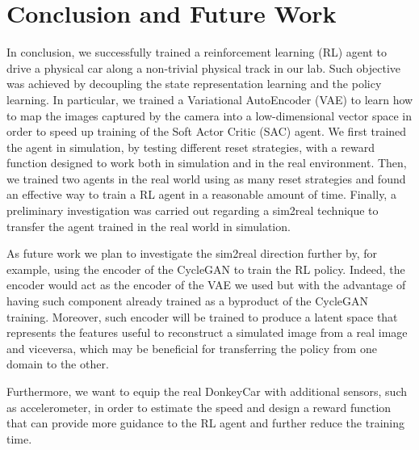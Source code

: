 \chapter{Conclusion and Future Work}

In conclusion, we successfully trained a reinforcement learning (RL) agent to drive a physical car along a non-trivial physical track in our lab. Such objective was achieved by decoupling the state representation learning and the policy learning. In particular, we trained a Variational AutoEncoder (VAE) to learn how to map the images captured by the camera into a low-dimensional vector space in order to speed up training of the Soft Actor Critic (SAC) agent. We first trained the agent in simulation, by testing different reset strategies, with a reward function designed to work both in simulation and in the real environment. Then, we trained two agents in the real world using as many reset strategies and found an effective way to train a RL agent in a reasonable amount of time. Finally, a preliminary investigation was carried out regarding a sim2real technique to transfer the agent trained in the real world in simulation.

As future work we plan to investigate the sim2real direction further by, for example, using the encoder of the CycleGAN to train the RL policy. Indeed, the encoder would act as the encoder of the VAE we used but with the advantage of having such component already trained as a byproduct of the CycleGAN training. Moreover, such encoder will be trained to produce a latent space that represents the features useful to reconstruct a simulated image from a real image and viceversa, which may be beneficial for transferring the policy from one domain to the other.

Furthermore, we want to equip the real DonkeyCar with additional sensors, such as accelerometer, in order to estimate the speed and design a reward function that can provide more guidance to the RL agent and further reduce the training time. 

